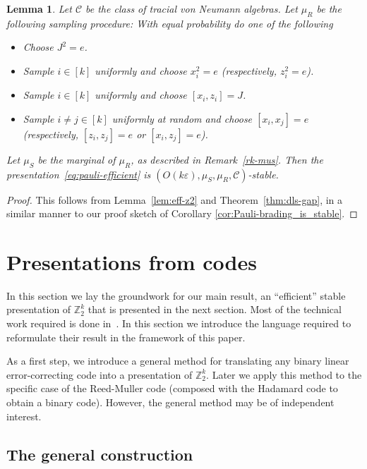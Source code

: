 \documentclass[11pt]{article}
\newtheorem{lemma}[theorem]{Lemma}
\theoremstyle{definition}
\newcommand{\Z}{\ensuremath{\mathbb{Z}}}
\newcommand{\mC}{\ensuremath{\mathcal{C}}}
\newcommand{\eps}{\varepsilon}
\begin{document}
\begin{lemma}\label{lem:eff-pauli}
  Let $\mC$ be the class of tracial von Neumann algebras. Let $\mu_R$ be the following sampling procedure: With equal probability do one of the following
  \begin{itemize}
      \item Choose $J^2=e$.
      \item Sample $i\in [k]$ uniformly and choose $x_i^2=e$ (respectively, $z_i^2=e$).
      \item Sample $i\in [k]$ uniformly and choose $[x_i,z_i]=J$.
      \item Sample $i\neq j\in [k]$ uniformly at random and choose $[x_i,x_j]=e$ (respectively, $[z_i,z_j]=e$ or $[x_i,z_j]=e$).
  \end{itemize}
  Let $\mu_S$ be the marginal of $\mu_R$, as described in Remark~\ref{rk-mus}. Then 
 the presentation~\eqref{eq:pauli-efficient} is $(O(k\eps),\mu_S,\mu_R,\mC)$-stable.
\end{lemma}

\begin{proof}
This follows from Lemma~\ref{lem:eff-z2} and Theorem~\ref{thm:dls-gap}, in a similar manner to our proof sketch of Corollary \ref{cor:Pauli-brading_is_stable}.
\end{proof}

\section{Presentations from codes}
\label{sec:pres-codes}

In this section we lay the groundwork for our main result, an ``efficient'' stable presentation of $\Z_2^k$ that is presented in the next section. Most of the technical work required is done in~\cite{ji2020mip}. In this section we introduce the language required to reformulate their result in the framework of this paper. 

As a first step, we introduce a general method for translating any binary linear error-correcting code into a presentation of $\Z_2^k$. Later we apply this method to the specific case of the Reed-Muller code (composed with the Hadamard code to obtain a binary code). However, the general method may be of independent interest. 

\subsection{The general construction}
\end{document}
